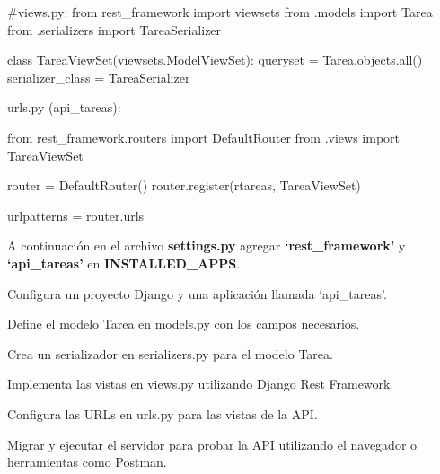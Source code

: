 \documentclass[
  a4paper,
  onepage,
  openany]{scrreprt}
\newenvironment{Shaded}{\begin{snugshade}}{\end{snugshade}}
\newcommand{\BuiltInTok}[1]{\textcolor[rgb]{0.00,0.23,0.31}{#1}}
\newcommand{\CommentTok}[1]{\textcolor[rgb]{0.37,0.37,0.37}{#1}}
\newcommand{\ImportTok}[1]{\textcolor[rgb]{0.00,0.46,0.62}{#1}}
\newcommand{\KeywordTok}[1]{\textcolor[rgb]{0.00,0.23,0.31}{#1}}
\newcommand{\NormalTok}[1]{\textcolor[rgb]{0.00,0.23,0.31}{#1}}
\newcommand{\OperatorTok}[1]{\textcolor[rgb]{0.37,0.37,0.37}{#1}}
\newcommand{\VerbatimStringTok}[1]{\textcolor[rgb]{0.13,0.47,0.30}{#1}}
\begin{document}
\begin{Shaded}
\begin{Highlighting}[]
\CommentTok{\#views.py:}
\ImportTok{from}\NormalTok{ rest\_framework }\ImportTok{import}\NormalTok{ viewsets}
\ImportTok{from}\NormalTok{ .models }\ImportTok{import}\NormalTok{ Tarea}
\ImportTok{from}\NormalTok{ .serializers }\ImportTok{import}\NormalTok{ TareaSerializer}

\KeywordTok{class}\NormalTok{ TareaViewSet(viewsets.ModelViewSet):}
\NormalTok{    queryset }\OperatorTok{=}\NormalTok{ Tarea.objects.}\BuiltInTok{all}\NormalTok{()}
\NormalTok{    serializer\_class }\OperatorTok{=}\NormalTok{ TareaSerializer}

\NormalTok{    urls.py (api\_tareas):}
\end{Highlighting}
\end{Shaded}

\begin{Shaded}
\begin{Highlighting}[]
\ImportTok{from}\NormalTok{ rest\_framework.routers }\ImportTok{import}\NormalTok{ DefaultRouter}
\ImportTok{from}\NormalTok{ .views }\ImportTok{import}\NormalTok{ TareaViewSet}

\NormalTok{router }\OperatorTok{=}\NormalTok{ DefaultRouter()}
\NormalTok{router.register(}\VerbatimStringTok{r\textquotesingle{}tareas\textquotesingle{}}\NormalTok{, TareaViewSet)}

\NormalTok{urlpatterns }\OperatorTok{=}\NormalTok{ router.urls}
\end{Highlighting}
\end{Shaded}

A continuación en el archivo \textbf{settings.py} agregar
\textbf{`rest\_framework'} y \textbf{`api\_tareas'} en
\textbf{INSTALLED\_APPS}.

\begin{tcolorbox}[enhanced jigsaw, breakable, opacityback=0, toptitle=1mm, coltitle=black, toprule=.15mm, rightrule=.15mm, colframe=quarto-callout-important-color-frame, opacitybacktitle=0.6, arc=.35mm, title=\textcolor{quarto-callout-important-color}{\faExclamation}\hspace{0.5em}{Actividad Práctica:}, titlerule=0mm, colbacktitle=quarto-callout-important-color!10!white, bottomtitle=1mm, bottomrule=.15mm, colback=white, left=2mm, leftrule=.75mm]

Configura un proyecto Django y una aplicación llamada `api\_tareas'.

Define el modelo Tarea en models.py con los campos necesarios.

Crea un serializador en serializers.py para el modelo Tarea.

Implementa las vistas en views.py utilizando Django Rest Framework.

Configura las URLs en urls.py para las vistas de la API.

Migrar y ejecutar el servidor para probar la API utilizando el navegador
o herramientas como Postman.

\end{tcolorbox}
\end{document}
